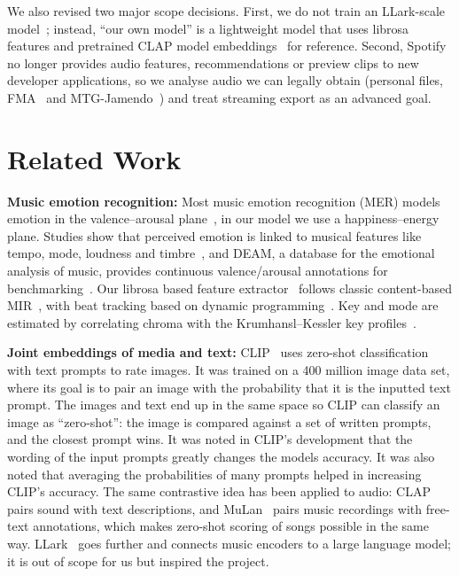 \documentclass{article}
\begin{document}
We also revised two major scope decisions. First, we do not train an LLark-scale
model~\cite{gardner2024llark}; instead, ``our own model'' is a lightweight model
that uses librosa features and pretrained CLAP model
embeddings~\cite{elizalde2023clap,wu2023laionclap} for reference. Second, Spotify no longer
provides audio features, recommendations or preview clips to new developer
applications, so we analyse audio we can legally obtain (personal files,
FMA~\cite{defferrard2017fma} and MTG-Jamendo~\cite{bogdanov2019jamendo}) and
treat streaming export as an advanced goal.

\section{Related Work}\label{sec:related}

\textbf{Music emotion recognition:}
Most music emotion recognition (MER) models emotion in the
valence--arousal plane~\cite{russell1980circumplex}, in our model we use a  
happiness--energy plane. Studies show that perceived emotion is linked to musical features like 
tempo, mode, loudness and timbre~\cite{kim2010mer,panda2023features}, and DEAM,
a database for the emotional analysis of music, provides continuous
valence/arousal annotations for benchmarking~\cite{aljanaki2017deam}. Our
librosa based feature extractor~\cite{mcfee2015librosa} follows classic content-based 
MIR~\cite{tzanetakis2002genre}, with beat tracking based on dynamic
programming~\cite{ellis2007beat}. Key and mode are estimated by
correlating chroma with the Krumhansl--Kessler key
profiles~\cite{krumhansl1990cognitive}.

\textbf{Joint embeddings of media and text:}
CLIP~\cite{radford2021clip} uses zero-shot classification with text prompts to rate images.
It was trained on a 400 million image data set, where its goal is to pair an image with the probability 
that it is the inputted text prompt. The images and text end up in the same space so CLIP can classify an image 
as ``zero-shot'': the image is compared against a set of written prompts, 
and the closest prompt wins. It was noted in CLIP's development that 
the wording of the input prompts greatly changes the models accuracy. It was 
also noted that averaging the probabilities of many prompts helped in 
increasing CLIP's accuracy. The same contrastive idea has been applied
to audio: CLAP~\cite{elizalde2023clap,wu2023laionclap} pairs sound with text
descriptions, and MuLan~\cite{huang2022mulan} pairs music recordings with
free-text annotations, which makes zero-shot scoring of songs possible in the
same way. LLark~\cite{gardner2024llark} goes further and connects music
encoders to a large language model; it is out of scope for us but inspired the
project.
\end{document}
